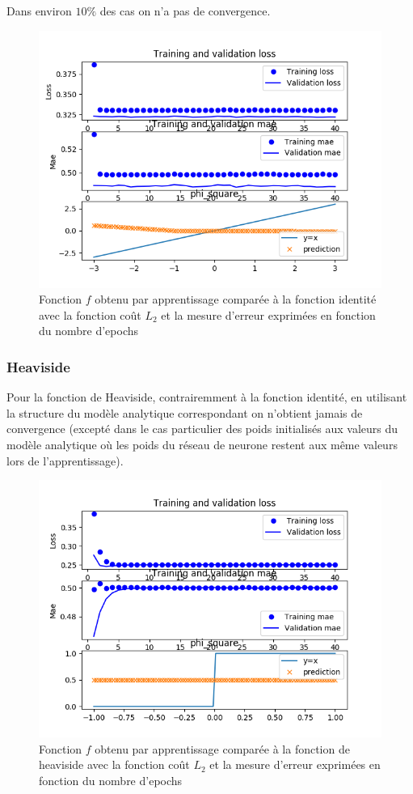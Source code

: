 \documentclass[a4paper,11pt,twoside]{report}
\begin{document}
	Dans environ $10\%$ des cas on n'a pas de convergence.
	
	\begin{figure}[H]
		\begin{center}
			\includegraphics[width=0.7\linewidth]{id_no.png}
			\caption{Fonction $f$ obtenu par apprentissage comparée à la fonction identité avec la fonction coût $L_2$ et la mesure d'erreur exprimées en fonction du nombre d'epochs}
		\end{center}	
	\end{figure}
	
	\subsubsection{Heaviside}
	Pour la fonction de Heaviside, contrairemment à la fonction identité, en utilisant la structure du modèle analytique correspondant on n'obtient jamais de convergence (excepté dans le cas particulier des poids initialisés aux valeurs du modèle analytique où les poids du réseau de neurone restent aux même valeurs lors de l'apprentissage).
	
	\begin{figure}[H]
		\begin{center}
			\includegraphics[width=0.7\linewidth]{hvs.png}
			\caption{Fonction $f$ obtenu par apprentissage comparée à la fonction de heaviside avec la fonction coût $L_2$ et la mesure d'erreur exprimées en fonction du nombre d'epochs}
		\end{center}
	\end{figure}
	
\end{document}
